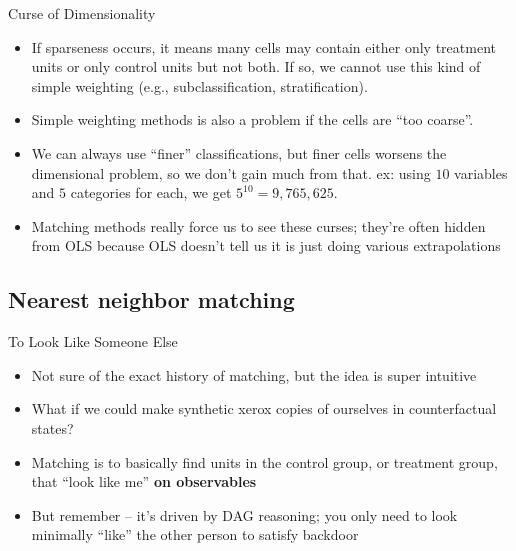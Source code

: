\documentclass{beamer}
\begin{document}
\begin{frame}{Curse of Dimensionality}
	
	\begin{itemize}
	\item If sparseness occurs, it means many cells may contain either only treatment units or only control units but not both.  If so, we cannot use this kind of simple weighting (e.g., subclassification, stratification).
	\item Simple weighting methods is also a problem if the cells are ``too coarse''.  
	\item We can always use ``finer'' classifications, but finer cells worsens the dimensional problem, so we don't gain  much from that.  ex: using $10$ variables and $5$ categories for each, we get $5^{10} = 9,765,625$.  
	\item Matching methods really force us to see these curses; they're often hidden from OLS because OLS doesn't tell us it is just doing various extrapolations
	\end{itemize}
\end{frame}	


\subsection{Nearest neighbor matching}

\begin{frame}{To Look Like Someone Else}

\begin{itemize}
\item Not sure of the exact history of matching, but the idea is super intuitive
\item What if we could make synthetic xerox copies of ourselves in counterfactual states?
\item Matching is to basically find units in the control group, or treatment group, that ``look like me'' \textbf{on observables}
\item But remember -- it's driven by DAG reasoning; you only need to look minimally ``like'' the other person to satisfy backdoor
\end{itemize}

\end{frame}
\end{document}
